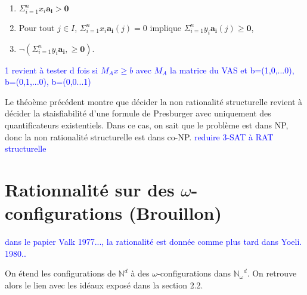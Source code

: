 \documentclass[a4paper,final]{article}
\theoremstyle{definition}
\let\geq\geqslant
\newcommand{\alain}[1]{\textcolor{blue}{#1}}
\newcommand{\os}[1]{\left\{\mathinner{#1}\right\}}
\newcommand{\N}{\ensuremath{\mathbb{N}}}
\newcommand{\Nomega}{\ensuremath{\mathbb{N}_\omega}}
\newcommand{\lang}{\ensuremath{\mathcal{L}}}
\newcommand{\vect}[1]{\ensuremath{\mathbf{#1}}}
\begin{document}
\begin{enumerate}
    \item $\Sigma_{i=1}^n x_i \vect{a_i} > \vect{0}$
    \item Pour tout $j \in I$, $\Sigma_{i=1}^n x_i \vect{a_i}(j)=0$ implique
$\Sigma_{i=1}^n y_i \vect{a_i}(j) \geq \vect{0}$,
    \item  $\lnot(\Sigma_{i=1}^n y_i \vect{a_i}, \geq \vect{0})$. 
\end{enumerate}

\alain{1 revient à tester d fois si $M_Ax\geq b$ avec $M_A$ la matrice du VAS et b=(1,0,...0), b=(0,1,...0), b=(0,0...1)}

Le théoème précédent montre que décider la non rationalité structurelle revient à décider la staisfiabilité d'une formule de Presburger avec uniquement des quantificateurs existentiels. Dans ce cas, on sait que le problème est dans NP, donc la non rationalité structurelle est dans co-NP. \alain{reduire 3-SAT à RAT structurelle}

\section{Rationnalité sur des $\omega$-configurations (Brouillon)}
\alain{dans le papier Valk 1977..., la rationalité est donnée comme plus tard dans Yoeli. 1980..}


On étend les configurations de $\N^d$ à des $\omega$-configurations dans $\Nomega^d$.
On retrouve alors le lien avec les idéaux exposé dans la section 2.2.
\end{document}
